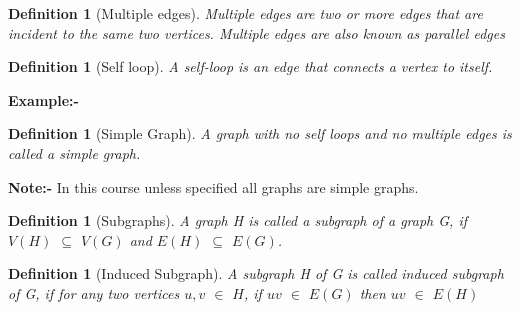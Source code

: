 \documentclass{article}
\newtheorem{definition}[theorem]{Definition}
\begin{document}
\begin{definition}[Multiple edges]
Multiple edges are two or more edges that are incident to the same two vertices. 
Multiple edges are also known as parallel edges
\end{definition}

\begin{definition}[Self loop]
A self-loop is an edge that connects a vertex to itself.
\end{definition}

\textbf{Example:-}\\
\begin{center}
\end{center}

\begin{definition}[Simple Graph]
A graph with no self loops and no multiple edges is called a simple graph.
\end{definition}

\textbf{Note:-}
In this course unless specified all graphs are simple graphs.\\

\begin{definition}[Subgraphs]
A graph H is called a subgraph of a graph G, if $V(H)$ $\subseteq$ $V(G)$
and $E(H)$ $\subseteq$ $E(G)$.
\end{definition}

\begin{definition}[Induced Subgraph]
A subgraph H of G is called induced subgraph of G, if for any two vertices 
$u,v$ $\in$ $H$, if $uv$ $\in$ $E(G)$ then $uv$ $\in$ $E(H)$
\end{definition}
\end{document}
